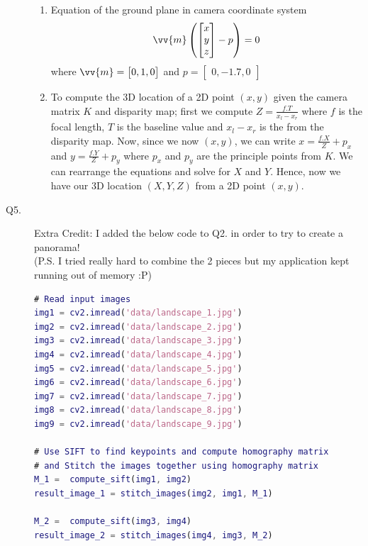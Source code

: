 \documentclass{csc_assignment4}
\begin{document}
\begin{description}
\begin{enumerate}[label=(\alph*)]
\item Equation of the ground plane in camera coordinate system 
\[
  \vv{m}
  \begin{pmatrix}
  \begin{bmatrix}
    x \\
    y \\
    z 
  \end{bmatrix}
  - p
  \end{pmatrix}
  = 0
\]
where $\vv{m} = \begin{bmatrix}0,1,0\end{bmatrix}$ and $p = \begin{bmatrix}0,-1.7,0\end{bmatrix}$

\item To compute the 3D location of a 2D point $(x, y)$ given the camera matrix $K$ and disparity map; first we compute $Z = \frac{f . T}{x_{l} - x_{r}}$ where $f$ is the focal length, $T$ is the baseline value and $x_{l} - x_{r}$ is the from the disparity map. Now, since we now $(x, y)$, we can write $x = \frac{f . X}{Z} + p_{x}$ and $y = \frac{f . Y}{Z} + p_{y}$ where $p_{x}$ and $p_{y}$ are the principle points from $K$. We can rearrange the equations and solve for $X$ and $Y$. Hence, now we have our 3D location $(X, Y, Z)$ from a 2D point $(x, y)$.
\end{enumerate}

\item[Q5.] Extra Credit: I added the below code to Q2. in order to try to create a panorama!
\\ (P.S. I tried really hard to combine the 2 pieces but my application kept running out of memory :P)
\begin{lstlisting}[language=MATLAB]
# Read input images
img1 = cv2.imread('data/landscape_1.jpg')
img2 = cv2.imread('data/landscape_2.jpg')
img3 = cv2.imread('data/landscape_3.jpg')
img4 = cv2.imread('data/landscape_4.jpg')
img5 = cv2.imread('data/landscape_5.jpg')
img6 = cv2.imread('data/landscape_6.jpg')
img7 = cv2.imread('data/landscape_7.jpg')
img8 = cv2.imread('data/landscape_8.jpg')
img9 = cv2.imread('data/landscape_9.jpg')

# Use SIFT to find keypoints and compute homography matrix
# and Stitch the images together using homography matrix
M_1 =  compute_sift(img1, img2)
result_image_1 = stitch_images(img2, img1, M_1)

M_2 =  compute_sift(img3, img4)
result_image_2 = stitch_images(img4, img3, M_2)


\end{lstlisting}
\end{description}
\end{document}
